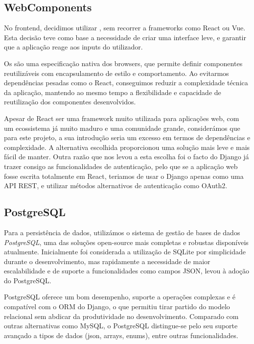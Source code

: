 \subsection{WebComponents}

No frontend, decidimos utilizar \textit{\cite{webcomponents}}, sem recorrer a frameworks como React ou Vue. Esta decisão teve como base a necessidade de criar uma interface leve, e garantir que a aplicação reage aos inputs do utilizador. 

Os \textit{\cite{webcomponents}} são uma especificação nativa dos browsers, que permite definir componentes reutilizáveis com encapsulamento de estilo e comportamento. Ao evitarmos dependências pesadas como o React, conseguimos reduzir a complexidade técnica da aplicação, mantendo ao mesmo tempo a flexibilidade e capacidade de reutilização dos componentes desenvolvidos.

Apesar de React ser uma framework muito utilizada para aplicações web,  com um ecossistema já muito maduro e uma comunidade grande, considerámos que para este projeto, a sua introdução seria um excesso em termos de dependências e complexidade. A alternativa escolhida proporcionou uma solução mais leve e mais fácil de manter. Outra razão que nos levou a esta escolha foi o facto do Django já trazer consigo as funcionalidades de autenticação, pelo que se a aplicação web fosse escrita totalmente em React, teriamos de usar o Django apenas como uma API REST, e utilizar métodos alternativos de autenticação como OAuth2.

\subsection{PostgreSQL}

Para a persistência de dados, utilizámos o sistema de gestão de bases de dados \textit{PostgreSQL}, uma das soluções open-source mais completas e robustas disponíveis atualmente. Inicialmente foi considerada a utilização de SQLite por simplicidade durante o desenvolvimento, mas rapidamente a necessidade de maior escalabilidade e de suporte a funcionalidades como campos JSON, levou à adoção do PostgreSQL.

PostgreSQL oferece um bom desempenho, suporte a operações complexas e é compatível com o ORM do Django, o que permitiu tirar partido do modelo relacional sem abdicar da produtividade no desenvolvimento. Comparado com outras alternativas como MySQL, o PostgreSQL distingue-se pelo seu suporte avançado a tipos de dados (\gls{json}, arrays, enums), entre outras funcionalidades.



